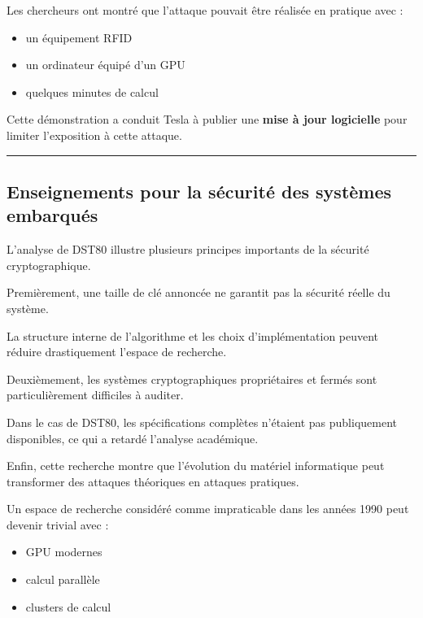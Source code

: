 \documentclass[
  french,
]{article}
\providecommand{\tightlist}{%
  \setlength{\itemsep}{0pt}\setlength{\parskip}{0pt}}
\begin{document}
Les chercheurs ont montré que l'attaque pouvait être réalisée en
pratique avec :

\begin{itemize}
\tightlist
\item
  un équipement RFID
\item
  un ordinateur équipé d'un GPU
\item
  quelques minutes de calcul
\end{itemize}

Cette démonstration a conduit Tesla à publier une \textbf{mise à jour
logicielle} pour limiter l'exposition à cette attaque.

\begin{center}\rule{0.5\linewidth}{0.5pt}\end{center}

\subsection{Enseignements pour la sécurité des systèmes
embarqués}\label{enseignements-pour-la-suxe9curituxe9-des-systuxe8mes-embarquuxe9s}

L'analyse de DST80 illustre plusieurs principes importants de la
sécurité cryptographique.

Premièrement, une taille de clé annoncée ne garantit pas la sécurité
réelle du système.

La structure interne de l'algorithme et les choix d'implémentation
peuvent réduire drastiquement l'espace de recherche.

Deuxièmement, les systèmes cryptographiques propriétaires et fermés sont
particulièrement difficiles à auditer.

Dans le cas de DST80, les spécifications complètes n'étaient pas
publiquement disponibles, ce qui a retardé l'analyse académique.

Enfin, cette recherche montre que l'évolution du matériel informatique
peut transformer des attaques théoriques en attaques pratiques.

Un espace de recherche considéré comme impraticable dans les années 1990
peut devenir trivial avec :

\begin{itemize}
\tightlist
\item
  GPU modernes
\item
  calcul parallèle
\item
  clusters de calcul
\end{itemize}
\end{document}
